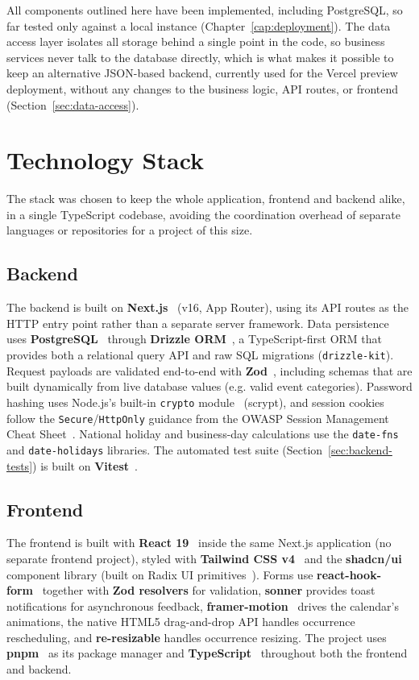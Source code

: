 All components outlined here have been implemented, including PostgreSQL, so far tested only against a local instance (Chapter~\ref{cap:deployment}). The data access layer isolates all storage behind a single point in the code, so business services never talk to the database directly, which is what makes it possible to keep an alternative JSON-based backend, currently used for the Vercel preview deployment, without any changes to the business logic, API routes, or frontend (Section~\ref{sec:data-access}).

\section{Technology Stack} \label{sec:tech-stack}

The stack was chosen to keep the whole application, frontend and backend alike, in a single TypeScript codebase, avoiding the coordination overhead of separate languages or repositories for a project of this size.

\subsection{Backend}
The backend is built on \textbf{Next.js}~\cite{nextjs} (v16, App Router), using its API routes as the HTTP entry point rather than a separate server framework. Data persistence uses \textbf{PostgreSQL}~\cite{postgresql} through \textbf{Drizzle ORM}~\cite{drizzleorm}, a TypeScript-first ORM that provides both a relational query API and raw SQL migrations (\texttt{drizzle-kit}). Request payloads are validated end-to-end with \textbf{Zod}~\cite{zod}, including schemas that are built dynamically from live database values (e.g. valid event categories). Password hashing uses Node.js's built-in \texttt{crypto} module~\cite{nodejscrypto} (scrypt), and session cookies follow the \texttt{Secure}/\texttt{HttpOnly} guidance from the OWASP Session Management Cheat Sheet~\cite{owasp}. National holiday and business-day calculations use the \texttt{date-fns} and \texttt{date-holidays} libraries. The automated test suite (Section~\ref{sec:backend-tests}) is built on \textbf{Vitest}~\cite{vitest}.

\subsection{Frontend}
The frontend is built with \textbf{React 19}~\cite{react} inside the same Next.js application (no separate frontend project), styled with \textbf{Tailwind CSS v4}~\cite{tailwindcss} and the \textbf{shadcn/ui}~\cite{shadcnui} component library (built on Radix UI primitives~\cite{radixui}). Forms use \textbf{react-hook-form}~\cite{reacthookform} together with \textbf{Zod resolvers} for validation, \textbf{sonner} provides toast notifications for asynchronous feedback, \textbf{framer-motion}~\cite{framermotion} drives the calendar's animations, the native HTML5 drag-and-drop API handles occurrence rescheduling, and \textbf{re-resizable} handles occurrence resizing. The project uses \textbf{pnpm}~\cite{pnpm} as its package manager and \textbf{TypeScript}~\cite{typescript} throughout both the frontend and backend.

